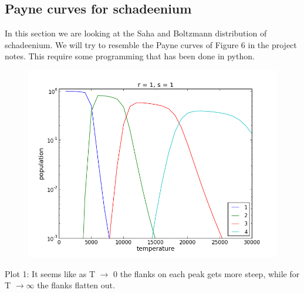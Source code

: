 \documentclass[norsk,a4paper,12pt]{article}
\begin{document}
\subsection{Payne curves for schadeenium}

In this section we are looking at the Saha and Boltzmann distribution of schadeenium. We will try to resemble the 
Payne curves of Figure 6 in the project notes. This require some programming that has been done in python. 

\begin{figure}[H] 
\begin{center} 
\includegraphics[scale=0.5]{ssa25.png} 
 

\caption{} 
\end{center} 
\end{figure}



Plot 1:
It seems like as T $\rightarrow$ 0 the flanks on each peak gets more steep, while for T $\rightarrow \infty $ the flanks 
flatten out. 
\end{document}
